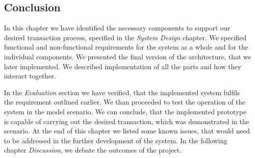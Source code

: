 \subsection{Conclusion}

In this chapter we have identified the necessary components to support our desired transaction process, specified in the \textit{System Design} chapter. We specified functional and non-functional requirements for the system as a whole and for the individual components. We presented the final version of the architecture, that we later implemented. We described implementation of all the parts and how they interact together.

In the \textit{Evaluation} section we have verified, that the implemented system fulfils the requirement outlined earlier. We than proceeded to test the operation of the system in the model scenario. We can conclude, that the implemented prototype is capable of carrying out the desired transaction, which was demonstrated in the scenario. At the end of this chapter we listed some known issues, that would need to be addressed in the further development of the system. In the following chapter \textit{Discussion}, we debate the outcomes of the project.